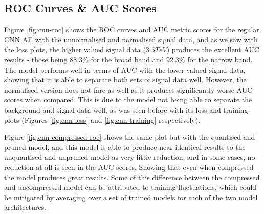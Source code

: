 \documentclass[a4paper]{article}
\theoremstyle{plain}
\theoremstyle{definition}
\begin{document}
        \subsection{ROC Curves \& AUC Scores}

            Figure \ref{fig:cnn-roc} shows the ROC curves and AUC metric scores for the regular CNN AE with the unnormalised and normalised signal data, and as we saw with the loss plots, the higher valued signal data ($3.5 TeV$) produces the excellent AUC results - those being 88.3\% for the broad band and 92.3\% for the narrow band. The model performs well in terms of AUC with the lower valued signal data, showing that it is able to separate both sets of signal data well. However, the normalised version does not fare as well as it produces significantly worse AUC scores when compared. This is due to the model not being able to separate the background and signal data well, as was seen before with its loss and training plots (Figures \ref{fig:cnn-loss} and \ref{fig:cnn-training} respectively).

            Figure \ref{fig:cnn-compressed-roc} shows the same plot but with the quantised and pruned model, and this model is able to produce near-identical results to the unquantised and unpruned model as very little reduction, and in some cases, no reduction at all is seen in the AUC scores. Showing that even when compressed the model produces great results. Some of this difference between the compressed and uncompressed model can be attributed to training fluctuations, which could be mitigated by averaging over a set of trained models for each of the two model architectures. 
\end{document}
